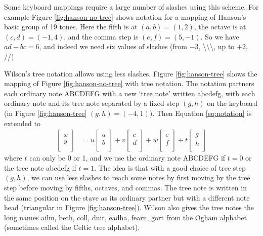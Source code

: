 \documentclass[a4paper,11pt]{article}
\begin{document}
Some keyboard mappings require a large number of slashes using this scheme. For
example Figure \ref{fig:hanson-no-tree} shows notation for a mapping of
Hanson's basic group of 19 tones. Here the fifth is at $(a, b) = (1, 2)$, the
octave is at $(c, d) = (-1, 4)$, and the comma step is $(e, f) = (5, -1)$. So
we have $ad - bc = 6$, and indeed we need six values of slashes (from $-3$,
\textbackslash{}\textbackslash{}\textbackslash{}, up to $+2$, //).

Wilson's tree notation \cite[40]{wilsonhebdomekontany} allows using less
slashes. Figure \ref{fig:hanson-tree} shows the mapping of Figure
\ref{fig:hanson-no-tree} with tree notation. The notation partners each
ordinary note ABCDEFG with a new `tree note' written abcdefg, with each
ordinary note and its tree note separated by a fixed step $(g, h)$ on the
keyboard (in Figure \ref{fig:hanson-tree} $(g, h) = (-4, 1)$). Then Equation
\ref{eq:notation} is extended to
\begin{align}
\begin{bmatrix}
    x \\
    y \\
\end{bmatrix}
    &=
u
\begin{bmatrix}
    a \\
    b \\
\end{bmatrix}
    +
v
\begin{bmatrix}
    c \\
    d \\
\end{bmatrix}
    +
w
\begin{bmatrix}
    e \\
    f \\
\end{bmatrix}
    +
t
\begin{bmatrix}
    g \\
    h \\
\end{bmatrix}
\label{eq:tree}
\end{align}
where $t$ can only be 0 or 1, and we use the ordinary note ABCDEFG if $t=0$ or
the tree note abcdefg if $t=1$. The idea is that with a good choice of tree
step $(g, h)$, we can use less slashes to reach some notes by first moving by
the tree step before moving by fifths, octaves, and commas. The tree note is
written in the same position on the stave as its ordinary partner but with a
different note head (triangular in Figure \ref{fig:hanson-tree}). Wilson also
gives the tree notes the long names ailm, beth, coll, duir, eadha, fearn, gort
from the Ogham alphabet (sometimes called the Celtic tree alphabet).
\end{document}
